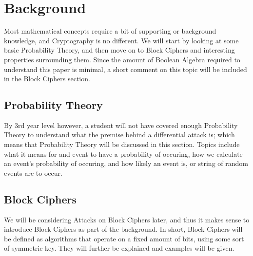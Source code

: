 



\chapter{Background} \label{c:background}

Most mathematical concepts require a bit of supporting or background
knowledge, and Cryptography is no different. We will start by looking
at some basic Probability Theory, and then move on to Block Ciphers
and interesting properties surrounding them. Since the amount of
Boolean Algebra required to understand this paper is minimal, a short
comment on this topic will be included in the Block Ciphers section.

\begin{comment}
In this chapter we establish some conventions and collect the
results from number theory about $\Z_{p^r}^*$, the multiplicative
group of integers modulo a prime power $p^r$, that we will need in
the rest of the thesis.
\end{comment}

\section{Probability Theory}
By 3rd year level however, a student will not have covered enough
Probability Theory to understand what the premise behind a 
differential attack is; which means that Probability Theory will
be discussed in this section. Topics include what it means for
and event to have a probability of occuring, how we calculate 
an event's probability of occuring, and how likely an
event is, or string of random events are to occur.


\section{Block Ciphers}
We will be considering Attacks on Block Ciphers later, and thus
it makes sense to introduce Block Ciphers as part of the background.
In short, Block Ciphers will be defined as algorithms that operate
on a fixed amount of bits, using some sort of symmetric key. They
will further be explained and examples will be given.
 
